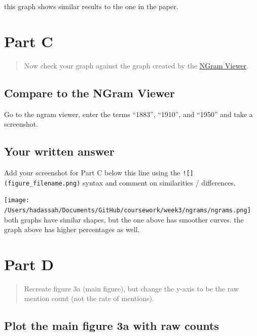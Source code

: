 \documentclass[
]{article}
\begin{document}
this graph shows similar results to the one in the paper.

\hypertarget{part-c}{%
\section{Part C}\label{part-c}}

\begin{quote}
Now check your graph against the graph created by the
\href{https://books.google.com/ngrams/}{NGram Viewer}.
\end{quote}

\hypertarget{compare-to-the-ngram-viewer}{%
\subsection{Compare to the NGram
Viewer}\label{compare-to-the-ngram-viewer}}

Go to the ngram viewer, enter the terms ``1883'', ``1910'', and ``1950''
and take a screenshot.

\hypertarget{your-written-answer-2}{%
\subsection{Your written answer}\label{your-written-answer-2}}

Add your screenshot for Part C below this line using the
\texttt{!{[}{]}(figure\_filename.png)} syntax and comment on
similarities / differences.

\texttt{[image: /Users/hadassah/Documents/GitHub/coursework/week3/ngrams/ngrams.png]}
both graphs have similar shapes, but the one above has smoother curves.
the graph above has higher percentages as well.

\hypertarget{part-d}{%
\section{Part D}\label{part-d}}

\begin{quote}
Recreate figure 3a (main figure), but change the y-axis to be the raw
mention count (not the rate of mentions).
\end{quote}

\hypertarget{plot-the-main-figure-3a-with-raw-counts}{%
\subsection{Plot the main figure 3a with raw
counts}\label{plot-the-main-figure-3a-with-raw-counts}}
\end{document}
